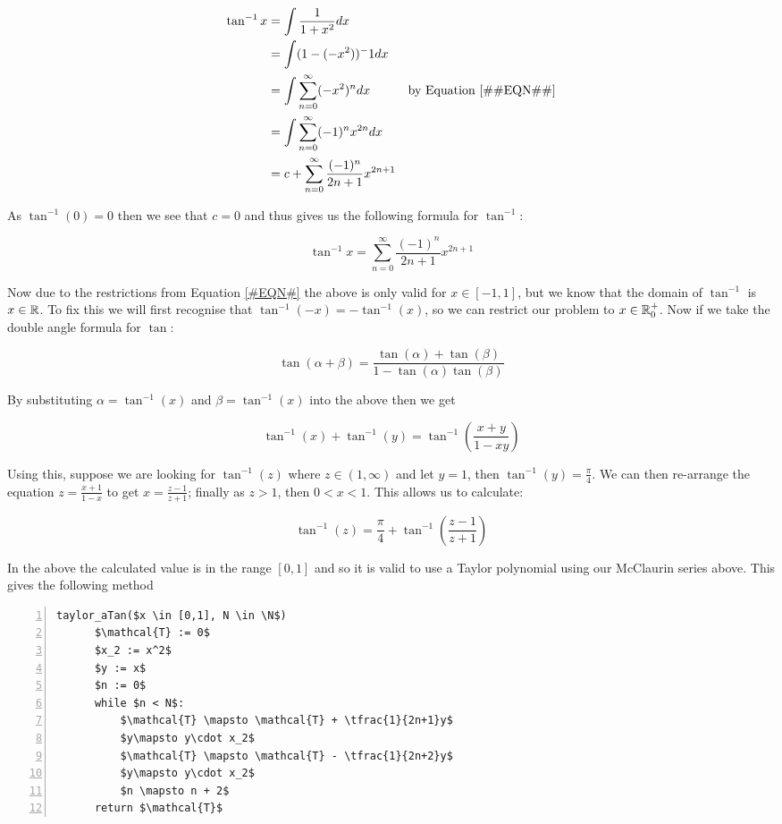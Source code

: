 {\begin{displaymath}
\begin{align*}
	\tan^{-1} x &= \int \frac{1}{1+x^2} dx\\
		&= \int (1 - (-x^2))^-1 dx\\
		&= \int \sum_{n=0}^\infty (-x^2)^n dx &\textrm{by Equation \ref{#EQN#}}\\
		&= \int \sum_{n=0}^\infty (-1)^nx^{2n} dx\\
		&= c + \sum_{n=0}^\infty \frac{(-1)^n}{2n+1}x^{2n+1}
\end{align*}
\end{displaymath}

As \(\tan^{-1} (0) = 0\) then we see that \(c = 0\) and thus gives us the following formula for \(\tan^{-1}\):

\[\tan^{-1} x = \sum_{n=0}^\infty \frac{(-1)^n}{2n+1}x^{2n+1}\]

Now due to the restrictions from Equation \ref{#EQN#} the above is only valid for \(x \in [-1, 1]\), but we know that the domain of \(\tan^{-1}\) is \(x \in \mathbb{R}\). To fix this we will first recognise that \(\tan^{-1}(-x) = -\tan^{-1}(x)\), so we can restrict our problem to \(x \in \mathbb{R}^+_0\). Now if we take the double angle formula for \(\tan\):

\[\tan(\alpha + \beta) = \frac{\tan(\alpha) + \tan(\beta)}{1 - \tan(\alpha)\tan(\beta)}\]

By substituting \(\alpha = \tan^{-1}(x)\) and \(\beta = \tan^{-1}(x)\) into the above then we get

\[\tan^{-1}(x) + \tan^{-1}(y) = \tan^{-1}\left(\frac{x + y}{1 - xy}\right)\]

Using this, suppose we are looking for \(\tan^{-1}(z)\) where \(z \in (1, \infty)\) and let \(y = 1\), then \(\tan^{-1}(y) = \frac{\pi}{4}\). We can then re-arrange the equation \(z = \frac{x + 1}{1 - x}\) to get \(x = \frac{z - 1}{z + 1}\); finally as \(z > 1\), then \(0 < x < 1\). This allows us to calculate:

\[\tan^{-1}(z) = \frac{\pi}{4} + \tan^{-1}\left(\frac{z-1}{z+1}\right)\]

In the above the calculated value is in the range \([0, 1]\) and so it is valid to use a Taylor polynomial using our McClaurin series above. This gives the following method

\begin{lstlisting}[numbers=left,frame=single,mathescape,caption={Taylor Method for \(\tan^{-1}\)},label={PCD_"Taylor aTan"}]
  taylor_aTan($x \in [0,1], N \in \N$)
      $\mathcal{T} := 0$
      $x_2 := x^2$
      $y := x$
      $n := 0$
      while $n < N$:
          $\mathcal{T} \mapsto \mathcal{T} + \tfrac{1}{2n+1}y$
          $y\mapsto y\cdot x_2$
          $\mathcal{T} \mapsto \mathcal{T} - \tfrac{1}{2n+2}y$
          $y\mapsto y\cdot x_2$
          $n \mapsto n + 2$
      return $\mathcal{T}$
\end{lstlisting}

}
